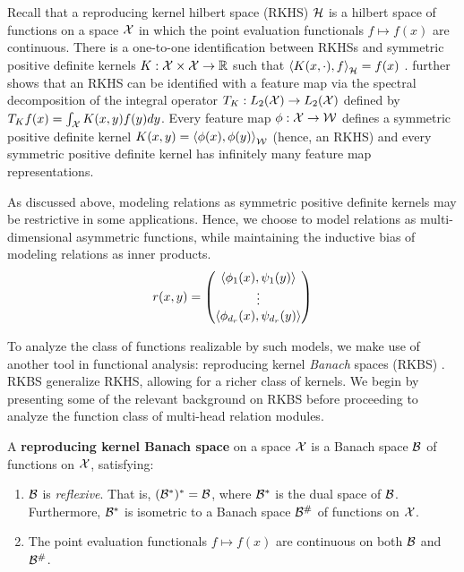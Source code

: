 Recall that a reproducing kernel hilbert space (RKHS) ${\mathcal{H}}$ is a hilbert space of functions on a space ${\mathcal{X}}$ in which the point evaluation functionals $f \mapsto f(x)$ are continuous. There is a one-to-one identification between RKHSs and symmetric positive definite kernels $K: {\mathcal{X}} \times {\mathcal{X}} \to \mathbb{R}$ such that $\left \langle K(x, \cdot), f \right\rangle_{\mathcal{H}} = f(x)$ \citep{moore-aronszajn}. \citep{mercerFunctionsPositive1909} further shows that an RKHS can be identified with a feature map via the spectral decomposition of the integral operator $T_K: L_2({\mathcal{X}}) \to L_2({\mathcal{X}})$ defined by $T_K f(x) = \int_{\mathcal{X}} K(x, y) f(y) dy$. Every feature map $\phi: {\mathcal{X}} \to {\mathcal{W}}$ defines a symmetric positive definite kernel $K(x, y) = \left \langle \phi(x), \phi(y) \right\rangle_{\mathcal{W}}$ (hence, an RKHS) and every symmetric positive definite kernel has infinitely many feature map representations.

As discussed above, modeling relations as symmetric positive definite kernels may be restrictive in some applications. Hence, we choose to model relations as multi-dimensional asymmetric functions, while maintaining the inductive bias of modeling relations as inner products.
\begin{equation*}
    r(x,y) = \begin{pmatrix} \left \langle \phi_1(x), \psi_1(y) \right\rangle \\ \vdots \\ \left \langle \phi_{d_r}(x), \psi_{d_r}(y) \right\rangle\end{pmatrix}
\end{equation*}

To analyze the class of functions realizable by such models, we make use of another tool in functional analysis: reproducing kernel \textit{Banach} spaces (RKBS) \citep{zhangReproducingKernel2009}. RKBS generalize RKHS, allowing for a richer class of kernels. We begin by presenting some of the relevant background on RKBS before proceeding to analyze the function class of multi-head relation modules.

\begin{definition}
    A \textbf{reproducing kernel Banach space} on a space ${\mathcal{X}}$ is a Banach space ${\mathcal{B}}$ of functions on ${\mathcal{X}}$, satisfying:
    \begin{enumerate}
        \item ${\mathcal{B}}$ is \textit{reflexive}. That is, $({\mathcal{B}}^*)^* = {\mathcal{B}}$, where ${\mathcal{B}}^*$ is the dual space of ${\mathcal{B}}$. Furthermore, ${\mathcal{B}}^*$ is isometric to a Banach space ${\mathcal{B}}^\#$ of functions on ${\mathcal{X}}$.
        \item The point evaluation functionals $f \mapsto f(x)$ are continuous on both ${\mathcal{B}}$ and ${\mathcal{B}}^\#$.
    \end{enumerate}
\end{definition}

